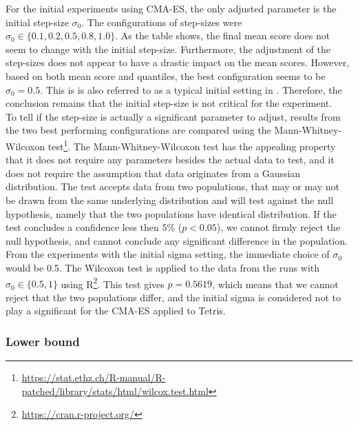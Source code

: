 
For the initial experiments using CMA-ES, 
the only adjusted parameter is the initial 
step-size $\sigma_0$. The configurations of step-sizes were 
$\sigma_0 \in \{0.1, 0.2, 0.5, 0.8, 1.0\}$. As the table shows,
the final mean score does not seem to change with the initial step-size.
Furthermore, the adjustment of the step-sizes does not appear to 
have a drastic impact on the mean scores. However, based on both mean score and
quantiles, the best configuration seems to be $\sigma_0 = 0.5$. This is 
is also referred to as a typical initial setting in \citep{boumaza2009}.
Therefore, the conclusion remains that the initial step-size is not critical 
for the experiment.\\

To tell if the step-size is actually a significant parameter to adjust, results from 
the two best performing configurations are compared using the Mann-Whitney-Wilcoxon test\footnote{\url{https://stat.ethz.ch/R-manual/R-patched/library/stats/html/wilcox.test.html}}.
The Mann-Whitney-Wilcoxon test has the appealing property that it does not require any parameters
besides the actual data to test, and it does not require the assumption that data originates 
from a Gaussian distribution. The test accepts data from two populations, that may or may not 
be drawn from the same underlying distribution and will test against the null hypothesis, 
namely that the two populations have identical distribution. If the test concludes a 
confidence less then $5\%$ ($p < 0.05$), we cannot firmly reject the null hypothesis, 
and cannot conclude any significant difference in the population. From the experiments
with the initial sigma setting, the immediate choice of $\sigma_0$ would be 0.5.
The Wilcoxon test is applied to the data from the runs with $\sigma_0 \in \{0.5, 1\}$
using R\footnote{\url{https://cran.r-project.org/}}.
This test gives $p=0.5619$, which means that we cannot reject that the two 
populations differ, and the initial sigma is considered not to play a significant 
for the CMA-ES applied to Tetris.

\subsubsection{Lower bound}

